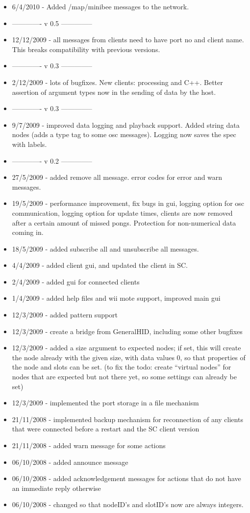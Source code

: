 \documentclass[letterpaper,10pt]{article}
\begin{document}
\begin{itemize}
 \item 6/4/2010 - Added /map/minibee messages to the network.
 
 \item ------------- v 0.5 --------------
 \item 12/12/2009 - all messages from clients need to have port no and client name. This breaks compatibility with previous versions.
 
 \item ------------- v 0.3 --------------
 \item 2/12/2009 - lots of bugfixes. New clients: processing and C++. Better assertion of argument types now in the sending of data by the host. 
 \item ------------- v 0.3 --------------
 \item 9/7/2009 - improved data logging and playback support. Added string data nodes (adds a type tag to some osc messages). Logging now saves the spec with labels.
 \item ------------- v 0.2 --------------
 \item 27/5/2009 - added remove all message. error codes for error and warn messages.
 \item 19/5/2009 - performance improvement, fix bugs in gui, logging option for osc communication, logging option for update times, clients are now removed after a certain amount of missed pongs. Protection for non-numerical data coming in.
 \item 18/5/2009 - added subscribe all and unsubscribe all messages.
 \item 4/4/2009 - added client gui, and updated the client in SC.
 \item 2/4/2009 - added gui for connected clients
 \item 1/4/2009 - added help files and wii mote support, improved main gui
 \item 12/3/2009 - added pattern support
 \item 12/3/2009 - create a bridge from GeneralHID, including some other bugfixes
 \item 12/3/2009 - added a size argument to expected nodes; if set, this will create the node already with the given size, with data values 0, so that properties of the node and slots can be set. (to fix the todo: create ``virtual nodes'' for nodes that are expected but not there yet, so some settings can already be set)
 \item 12/3/2009 - implemented the port storage in a file mechanism
 \item 21/11/2008 - implemented backup mechanism for reconnection of any clients that were connected before a restart and the SC client version
 \item 21/11/2008 - added warn message for some actions
 \item 06/10/2008 - added announce message
 \item 06/10/2008 - added acknowledgement messages for actions that do not have an immediate reply otherwise
 \item 06/10/2008 - changed so that nodeID's and slotID's now are always integers.
\end{itemize}
\end{document}
